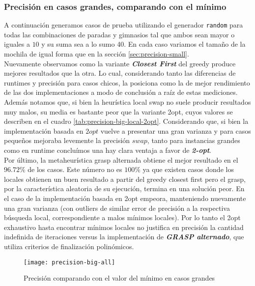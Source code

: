 \subsubsection{Precisión en casos grandes, comparando con el mínimo}
\label{sec:precision-big}

A continuación generamos casos de prueba utilizando el generador \texttt{random} para todas las combinaciones de paradas y gimnasios tal que ambos
sean mayor o iguales a $10$ y su suma sea a lo sumo 40.
En cada caso variamos el tamaño de la mochila de igual forma que en la sección \ref{sec:precision-small}.
\\

Nuevamente observamos como la variante \textbf{\emph{Closest First}} del greedy produce mejores resultados que la otra. Lo cual, considerando tanto las diferencias de runtimes y precisión para casos chicos, la posiciona como la de mejor rendimiento de las dos implementaciones a modo de conclusión a raíz de estas mediciones.
\\

Además notamos que, si bien la heurística local swap no suele producir resultados muy malos,
su media es bastante peor que la variante 2opt, cuyos valores se describen en el cuadro \ref{tab:precision-big-local-2opt}. Considerando que, si bien la implementación basada en $2opt$ vuelve a presentar una gran varianza y para casos pequeños mejoraba levemente la precisión $swap$, tanto para instancias grandes como en runtime concluímos una hay clara ventaja a favor de \textbf{\emph{2-opt}}.
\\

Por último, la metaheurística grasp alternada obtiene el mejor resultado en el $96.72\%$ de los casos.
Este número no es $100\%$ ya que existen casos donde los locales obtienen un buen resultado a partir del greedy closest first pero el grasp, por la característica aleatoria de su ejecución, termina en una solución peor.
En el caso de la implementación basada en 2opt empeora, manteniendo nuevamente una gran varianza (con outliers de similar error de precisión a la respectiva búsqueda local, correspondiente a malos mínimos locales). Por lo tanto el 2opt exhaustivo hasta encontrar mínimos locales no justifica en precisión la cantidad indefinida de iteraciones versus la implementación de \textbf{\emph{GRASP alternado}}, que utiliza criterios de finalización polinómicos.

\begin{figure}[H]
    \centering
    \texttt{[image: precision-big-all]}
    \caption{Precisión comparando con el valor del mínimo en casos grandes}
    \label{fig:precision-big-all}
\end{figure}



